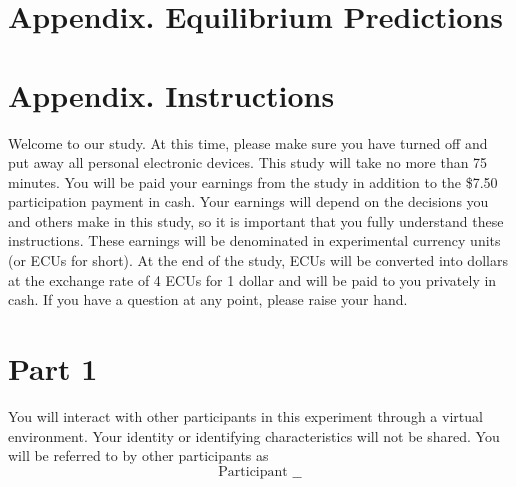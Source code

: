 \documentclass[11pt]{article}
\begin{document}
\begin{table}[H]
  \centering
  \caption{Pairwise correlations of emotion measures}
  \label{tab:emotion_correlations}
  
\end{table}

\newpage

\section*{Appendix. Equilibrium Predictions} \label{sec:app_equilibrium}

\begin{table}[h]
  \centering
  \caption{Average equilibrium belief $\pi = \Pr(z=G)$ at sale by seller position ($k$) and risk aversion ($\alpha$), under the Random and Average payoff schemes. Values averaged over 10{,}000 simulated games using derived equilibrium strategies.}
  \label{tab:equilibrium_thresholds}
  
\end{table}

\newpage

\section*{Appendix. Instructions} \label{sec:app_instr}



Welcome to our study. At this time, please make sure you have turned off and put away
all personal electronic devices. This study will take no more than 75 minutes. You will be paid your earnings from the study in addition to the \$7.50 participation
payment in cash. Your earnings will depend on the decisions you and others make in this study, so it is important that you fully understand these instructions. These earnings will be denominated in experimental currency units (or ECUs for short). At the end of the study, ECUs will be converted into dollars at the exchange rate of 4 ECUs for 1 dollar and will be paid to you privately in cash. If you have a question at any point, please raise your hand.


\newpage
\section*{Part 1}

You will interact with other participants in this experiment through a virtual environment. Your identity or identifying characteristics will not be shared. You will be referred to by other participants as $$\text{Participant \_\_}$$
\end{document}
